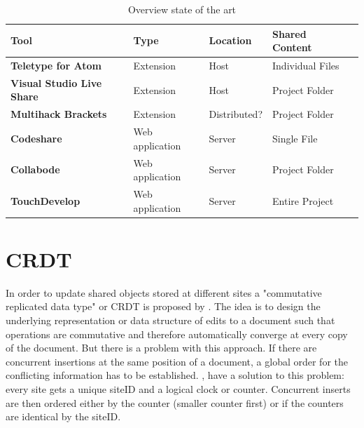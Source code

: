 \begin{table}
	\centering
	\begin{tabular}{| >{\bfseries}l | l | l | l | l | }
		\hline
			\rowcolor{orange} \bfseries Tool & \bfseries Type & \bfseries Location & \bfseries Shared Content \\
		\hline
		\hline
			Teletype for Atom & Extension & Host & Individual Files \\\hline
			Visual Studio Live Share & Extension & Host & Project Folder \\\hline
			Multihack Brackets & Extension &  Distributed? & Project Folder \\\hline
			Codeshare & Web application & Server & Single File \\\hline
			Collabode & Web application & Server & Project Folder \\\hline
			TouchDevelop & Web application & Server & Entire Project \\
		\hline
	\end{tabular}
	\caption{Overview state of the art}
	\label{tab:sota}
\end{table}

\section{CRDT}
In order to update shared objects stored at different sites a "commutative replicated data type" or CRDT is proposed by \cite{PreguicaMarquesShapiroLetia:2009}. The idea is to design the underlying representation or data structure of edits to a document such that operations are commutative and therefore automatically converge at every copy of the document.
But there is a problem with this approach. If there are concurrent insertions at the same position of a document, a global order for the conflicting information has to be established. \cite{PreguicaMarquesShapiroLetia:2009},\cite{Oster:2006:DataconsistencyforP2Pcollaborativeediting} have a solution to this problem: every site gets a unique siteID and a logical clock or counter. Concurrent inserts are then ordered either by the counter (smaller counter first) or if the counters are identical by the siteID.

